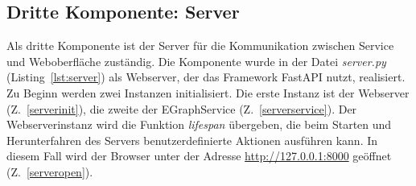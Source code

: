 












\subsection{Dritte Komponente: Server}

Als dritte Komponente ist der Server für die Kommunikation zwischen Service und Weboberfläche zuständig.
Die Komponente wurde in der Datei \textit{server.py} (Listing~\ref{lst:server}) als Webserver, der das Framework FastAPI nutzt, realisiert. 
Zu Beginn werden zwei Instanzen initialisiert. Die erste Instanz ist der Webserver (Z.~\ref{serverinit}), die zweite der EGraphService (Z.~\ref{serverservice}).
Der Webserverinstanz wird die Funktion \textit{lifespan} übergeben, die beim Starten und Herunterfahren des Servers benutzerdefinierte Aktionen ausführen kann.
In diesem Fall wird der Browser unter der Adresse \url{http://127.0.0.1:8000} geöffnet (Z.~\ref{serveropen}).

